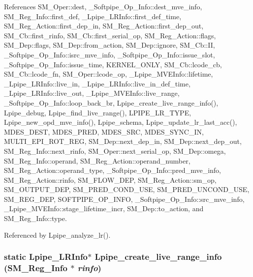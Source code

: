 References SM\_\-Oper::dest, \_\-Softpipe\_\-Op\_\-Info::dest\_\-mve\_\-info, SM\_\-Reg\_\-Info::first\_\-def, \_\-Lpipe\_\-LRInfo::first\_\-def\_\-time, SM\_\-Reg\_\-Action::first\_\-dep\_\-in, SM\_\-Reg\_\-Action::first\_\-dep\_\-out, SM\_\-Cb::first\_\-rinfo, SM\_\-Cb::first\_\-serial\_\-op, SM\_\-Reg\_\-Action::flags, SM\_\-Dep::flags, SM\_\-Dep::from\_\-action, SM\_\-Dep::ignore, SM\_\-Cb::II, \_\-Softpipe\_\-Op\_\-Info::isrc\_\-mve\_\-info, \_\-Softpipe\_\-Op\_\-Info::issue\_\-slot, \_\-Softpipe\_\-Op\_\-Info::issue\_\-time, KERNEL\_\-ONLY, SM\_\-Cb::lcode\_\-cb, SM\_\-Cb::lcode\_\-fn, SM\_\-Oper::lcode\_\-op, \_\-Lpipe\_\-MVEInfo::lifetime, \_\-Lpipe\_\-LRInfo::live\_\-in, \_\-Lpipe\_\-LRInfo::live\_\-in\_\-def\_\-time, \_\-Lpipe\_\-LRInfo::live\_\-out, \_\-Lpipe\_\-MVEInfo::live\_\-range, \_\-Softpipe\_\-Op\_\-Info::loop\_\-back\_\-br, Lpipe\_\-create\_\-live\_\-range\_\-info(), Lpipe\_\-debug, Lpipe\_\-find\_\-live\_\-range(), LPIPE\_\-LR\_\-TYPE, Lpipe\_\-new\_\-opd\_\-mve\_\-info(), Lpipe\_\-schema, Lpipe\_\-update\_\-lr\_\-last\_\-acc(), MDES\_\-DEST, MDES\_\-PRED, MDES\_\-SRC, MDES\_\-SYNC\_\-IN, MULTI\_\-EPI\_\-ROT\_\-REG, SM\_\-Dep::next\_\-dep\_\-in, SM\_\-Dep::next\_\-dep\_\-out, SM\_\-Reg\_\-Info::next\_\-rinfo, SM\_\-Oper::next\_\-serial\_\-op, SM\_\-Dep::omega, SM\_\-Reg\_\-Info::operand, SM\_\-Reg\_\-Action::operand\_\-number, SM\_\-Reg\_\-Action::operand\_\-type, \_\-Softpipe\_\-Op\_\-Info::pred\_\-mve\_\-info, SM\_\-Reg\_\-Action::rinfo, SM\_\-FLOW\_\-DEP, SM\_\-Reg\_\-Action::sm\_\-op, SM\_\-OUTPUT\_\-DEP, SM\_\-PRED\_\-COND\_\-USE, SM\_\-PRED\_\-UNCOND\_\-USE, SM\_\-REG\_\-DEP, SOFTPIPE\_\-OP\_\-INFO, \_\-Softpipe\_\-Op\_\-Info::src\_\-mve\_\-info, \_\-Lpipe\_\-MVEInfo::stage\_\-lifetime\_\-incr, SM\_\-Dep::to\_\-action, and SM\_\-Reg\_\-Info::type.

Referenced by Lpipe\_\-analyze\_\-lr().
\subsubsection{\setlength{\rightskip}{0pt plus 5cm}static \bf{Lpipe\_\-LRInfo}$\ast$ Lpipe\_\-create\_\-live\_\-range\_\-info (\bf{SM\_\-Reg\_\-Info} $\ast$ {\em rinfo})\hspace{0.3cm}{\tt  [static]}}\label{l__mve_8c_88cf47566d993f9dbdcd9a5ad50c70f3}




